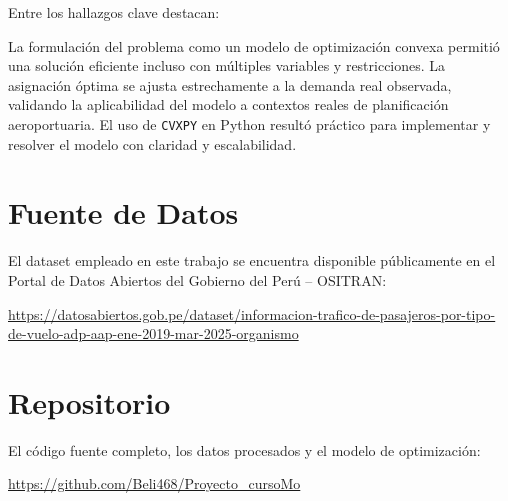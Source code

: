\documentclass[11pt, a4paper, twocolumn]{article}
\begin{document}
Entre los hallazgos clave destacan:

La formulación del problema como un modelo de optimización convexa permitió una solución eficiente incluso con múltiples variables y restricciones.
La asignación óptima se ajusta estrechamente a la demanda real observada, validando la aplicabilidad del modelo a contextos reales de planificación aeroportuaria.
El uso de \texttt{CVXPY} en Python resultó práctico para implementar y resolver el modelo con claridad y escalabilidad.\\

\section*{Fuente de Datos}
El dataset empleado en este trabajo se encuentra disponible públicamente en el Portal de Datos Abiertos del Gobierno del Perú – OSITRAN:

\noindent \url{https://datosabiertos.gob.pe/dataset/informacion-trafico-de-pasajeros-por-tipo-de-vuelo-adp-aap-ene-2019-mar-2025-organismo}

\section*{Repositorio}
El código fuente completo, los datos procesados y el modelo de optimización:

\noindent \url{https://github.com/Beli468/Proyecto_cursoMo}




\end{document}
